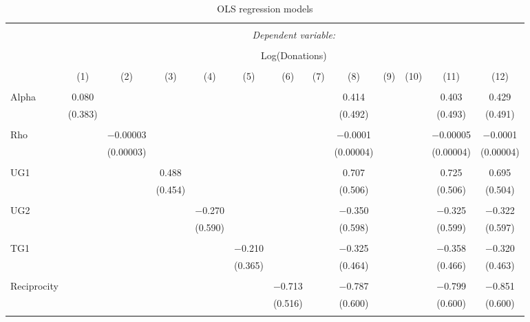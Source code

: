 \documentclass[12pt]{article}
\begin{document}
\begin{table}[!htbp] \centering 
  \caption{OLS regression models} 
  \label{} 
   \begin{adjustbox}{width=\textwidth}
\begin{tabular}{@{\extracolsep{5pt}}lcccccccccccc} 
\\[-1.8ex]\hline 
\hline \\[-1.8ex] 
 & \multicolumn{12}{c}{\textit{Dependent variable:}} \\ 
\cline{2-13} 
\\[-1.8ex] & \multicolumn{12}{c}{Log(Donations)} \\ 
\\[-1.8ex] & (1) & (2) & (3) & (4) & (5) & (6) & (7) & (8) & (9) & (10) & (11) & (12)\\ 
\hline \\[-1.8ex] 
 Alpha & 0.080 &  &  &  &  &  &  & 0.414 &  &  & 0.403 & 0.429 \\ 
  & (0.383) &  &  &  &  &  &  & (0.492) &  &  & (0.493) & (0.491) \\ 
  & & & & & & & & & & & & \\ 
 Rho &  & $-$0.00003 &  &  &  &  &  & $-$0.0001 &  &  & $-$0.00005 & $-$0.0001 \\ 
  &  & (0.00003) &  &  &  &  &  & (0.00004) &  &  & (0.00004) & (0.00004) \\ 
  & & & & & & & & & & & & \\ 
 UG1 &  &  & 0.488 &  &  &  &  & 0.707 &  &  & 0.725 & 0.695 \\ 
  &  &  & (0.454) &  &  &  &  & (0.506) &  &  & (0.506) & (0.504) \\ 
  & & & & & & & & & & & & \\ 
 UG2 &  &  &  & $-$0.270 &  &  &  & $-$0.350 &  &  & $-$0.325 & $-$0.322 \\ 
  &  &  &  & (0.590) &  &  &  & (0.598) &  &  & (0.599) & (0.597) \\ 
  & & & & & & & & & & & & \\ 
 TG1 &  &  &  &  & $-$0.210 &  &  & $-$0.325 &  &  & $-$0.358 & $-$0.320 \\ 
  &  &  &  &  & (0.365) &  &  & (0.464) &  &  & (0.466) & (0.463) \\ 
  & & & & & & & & & & & & \\ 
 Reciprocity &  &  &  &  &  & $-$0.713 &  & $-$0.787 &  &  & $-$0.799 & $-$0.851 \\ 
  &  &  &  &  &  & (0.516) &  & (0.600) &  &  & (0.600) & (0.600) \\ 
  & & & & & & & & & & & & \\ 

\end{tabular}
\end{adjustbox}
\end{table}
\end{document}
